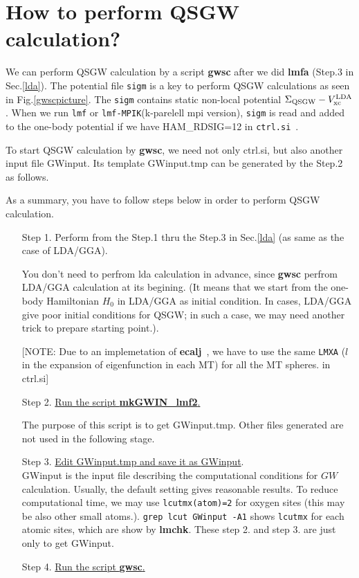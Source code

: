 \documentclass[a4paper,10pt,epsf,fleqn]{article}
\newcommand{\GW}{$GW$}
\newcommand{\exe}[1]{{\bf #1}}
\newcommand{\io}[1]{{\sf  #1}}
\newcommand{\ecalj}{{\bf ecalj}\ }
\newcommand{\ctrl}[1]{{\tt ctrl.{#1}}\ }
\begin{document}
\newpage
\section{How to perform QSGW calculation?}

We can perform QSGW calculation by a script \exe{gwsc}
after we did \exe{lmfa} (Step.3 in Sec.\ref{lda}).
The potential file \verb#sigm# is a key to perform QSGW calculations as seen in
Fig.\ref{gwscpicture}. The \verb#sigm# contains static non-local potential 
$\Sigma_{\rm QSGW}-V_{\rm xc}^{\rm LDA}$. 
When we run \verb#lmf# or \verb#lmf-MPIK#(k-parelell mpi version),
\verb#sigm# is read and added to the one-body potential 
if we have \io{HAM\_RDSIG=12} in \ctrl{si}. 

To start QSGW calculation by \exe{gwsc},
we need not only \io{ctrl.si}, but also another input file \io{GWinput}.
Its template \io{GWinput.tmp} can be generated by the Step.2 as follows.

As a summary, you have to follow steps below
in order to perform QSGW calculation.
\begin{enumerate}
\item[Step 1.] Perform from the Step.1 thru the Step.3 in Sec.\ref{lda}
	     (as same as the case of LDA/GGA).

You don't need to perfrom lda calculation in advance,
since \exe{gwsc} perfrom LDA/GGA calculation at its begining.
(It means that we start from the one-body Hamiltonian $H_0$ in LDA/GGA as initial condition.
In cases, LDA/GGA give poor initial conditions for QSGW; in such a case,
we may need another trick to prepare starting point.).

[NOTE: Due to an implemetation of \ecalj,
we have to use the same \verb#LMXA# ($l$ in the expansion of eigenfunction 
in each MT) for all the MT spheres. in \io{ctrl.si}]

\item[Step 2.]\underline{Run the script \exe{mkGWIN\_lmf2}.}

The purpose of this script is to get \io{GWinput.tmp}.
Other files generated are not used in the following stage.

\item[Step 3.]\underline{Edit \io{GWinput.tmp} and save it as \io{GWinput}}.\\
\io{GWinput} is the input file describing the computational 
conditions for \GW calculation. 
Usually, the default setting gives reasonable results.
To reduce computational time, we may
use \verb#lcutmx(atom)=2# for oxygen sites 
(this may be also other small atoms.).
\verb#grep lcut GWinput -A1# shows \verb#lcutmx# for each atomic sites,
which are show by \exe{lmchk}.
These step 2. and step 3. are just only to get \io{GWinput}.

\item[Step 4.]\underline{ Run the script \exe{gwsc}.}
\end{enumerate}
\end{document}
